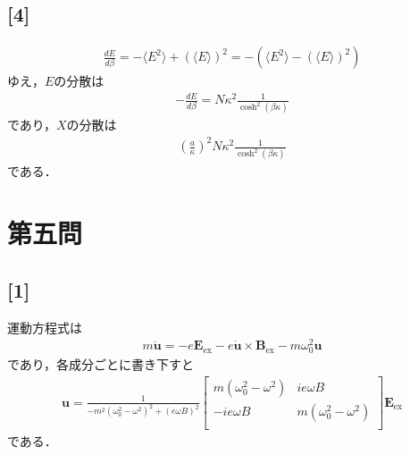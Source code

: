 \documentclass[12pt,dvipdfmx]{jsarticle}
\begin{document}
\subsection*{\large{[4]}}
\begin{eqnarray}
  \frac{dE}{d\beta} = - \langle E^2 \rangle + (\langle E \rangle )^2 = -\left( \langle E^2 \rangle- (\langle E \rangle )^2 \right)
\end{eqnarray}
ゆえ，$E$の分散は
\begin{eqnarray}
  -\frac{dE}{d\beta} = N\kappa^2 \frac{1}{\cosh^2(\beta\kappa)}
\end{eqnarray}
であり，$X$の分散は
\begin{eqnarray}
  (\frac{a}{\kappa})^2N\kappa^2 \frac{1}{\cosh^2(\beta\kappa)} 
\end{eqnarray}
である．
\newpage
\section*{\Large{第五問}}
\subsection*{\large{[1]}}
運動方程式は
\begin{eqnarray}
  m\ddot{\bm{u}} = -e\bm{E}_{\text{ex}} - e\dot{\bm{u}}\times\bm{B}_{\text{ex}} - m\omega_0^2 \bm{u}
\end{eqnarray}
であり，各成分ごとに書き下すと
\begin{eqnarray}
  \bm{u}
  =\frac{1}{-m^2(\omega_0^2-\omega^2)^2+(e\omega B)^2} 
  \begin{bmatrix}
    m(\omega_0^2-\omega^2) & ie\omega B\\
    -ie\omega B & m(\omega_0^2-\omega^2) \\
  \end{bmatrix}
  \bm{E}_{\text{ex}}
\end{eqnarray}
である．
\end{document}
